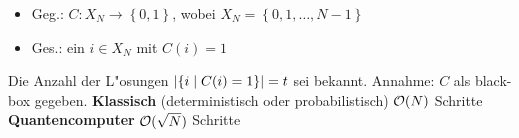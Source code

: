



\frenchspacing
\sf

\pagestyle{nohead_beth}

%
%

\begin{slide}\sf
{}
\begin{itemize}
  \item  Geg.: $C:X_N \to \left\{ 0,1\right\}$, wobei $X_N=\left\{0,1,\ldots ,N-1\right\}$
  \item  Ges.: ein $i\in X_N$ mit $C(i)=1$
\end{itemize}
\vfill
Die Anzahl der L"osungen $\vert \{i\mid C(i)=1\} \vert = t$ sei bekannt.
\vfill
Annahme: $C$ als black-box gegeben.
\vfill
{\bf Klassisch} (deterministisch oder probabilistisch) ${\cal O}(N)$ Schritte  \\
{\bf Quantencomputer} ${\cal O}(\sqrt{N})$ Schritte
\vfill
\end{slide}

%
%

